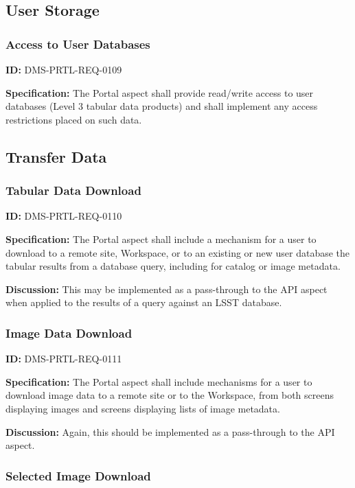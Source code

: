 \documentclass[SE,toc,lsstdraft]{lsstdoc}
\begin{document}
\subsection{User Storage}

\subsubsection{Access to User Databases}

\label{DMS-PRTL-REQ-0109}
\textbf{ID:} DMS-PRTL-REQ-0109

\textbf{Specification:}
The Portal aspect shall provide read/write access to user databases (Level 3 tabular data products) and shall implement any access restrictions placed on such data.

\subsection{Transfer Data}

\subsubsection{Tabular Data Download}

\label{DMS-PRTL-REQ-0110}
\textbf{ID:} DMS-PRTL-REQ-0110

\textbf{Specification:}
The Portal aspect shall include a mechanism for a user to download to a remote site, Workspace, or to an existing or new user database the tabular results from a database query, including for catalog or image metadata.

\textbf{Discussion:}
This may be implemented as a pass-through to the API aspect when applied to the results of a query against an LSST database.

\subsubsection{Image Data Download}

\label{DMS-PRTL-REQ-0111}
\textbf{ID:} DMS-PRTL-REQ-0111

\textbf{Specification:}
The Portal aspect shall include mechanisms for a user to download image data to a remote site or to the Workspace, from both screens displaying images and screens displaying lists of image metadata.

\textbf{Discussion:}
Again, this should be implemented as a pass-through to the API aspect.

\subsubsection{Selected Image Download}
\end{document}

